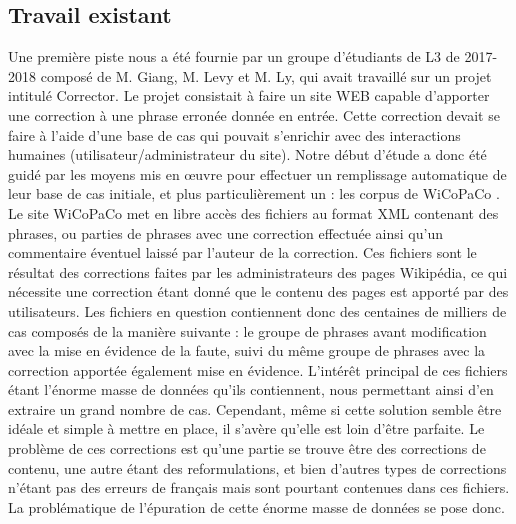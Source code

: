 \documentclass[11pt]{article}
\begin{document}
\subsection{Travail existant}

Une premi\`{e}re piste nous a \'{e}t\'{e} fournie par un groupe d'\'{e}tudiants de L3 de 2017-2018 compos\'{e} de M. Giang, M. Levy et M. Ly, qui avait travaill\'{e} sur un projet intitul\'{e} Corrector. Le projet consistait \`{a} faire un site WEB capable d'apporter une correction \`{a} une phrase erron\'{e}e donn\'{e}e en entr\'{e}e. Cette correction devait se faire \`{a} l'aide d'une base de cas qui pouvait s'enrichir avec des interactions humaines (utilisateur/administrateur du site). 
\newline
\newline
Notre d\'{e}but d'\'{e}tude a donc \'{e}t\'{e} guid\'{e} par les moyens mis en {\oe}uvre pour effectuer un remplissage automatique de leur base de cas initiale, et plus particuli\`{e}rement un : les corpus de WiCoPaCo \autocite[2]{https://wicopaco.limsi.fr}. Le site WiCoPaCo met en libre acc\`{e}s des fichiers au format XML contenant des phrases, ou parties de phrases avec une correction effectu\'{e}e ainsi qu'un commentaire \'{e}ventuel laiss\'{e} par l'auteur de la correction. Ces fichiers sont le r\'{e}sultat des corrections faites par les administrateurs des pages Wikip\'{e}dia, ce qui n\'{e}cessite une correction \'{e}tant donn\'{e} que le contenu des pages est apport\'{e} par des utilisateurs. Les fichiers en question contiennent donc des centaines de milliers de cas compos\'{e}s de la mani\`{e}re suivante : le groupe de phrases avant modification avec la mise en \'{e}vidence de la faute, suivi du m\^{e}me groupe de phrases avec la correction apport\'{e}e \'{e}galement mise en \'{e}vidence. 
\newline
\newline
L'int\'{e}r\^{e}t principal de ces fichiers \'{e}tant l'\'{e}norme masse de donn\'{e}es qu'ils contiennent, nous permettant ainsi d'en extraire un grand nombre de cas. Cependant, m\^{e}me si cette solution semble \^{e}tre id\'{e}ale et simple \`{a} mettre en place, il s'av\`{e}re qu'elle est loin d'\^{e}tre parfaite. Le probl\`{e}me de ces corrections est qu'une partie se trouve \^{e}tre des corrections de contenu, une autre \'{e}tant des reformulations, et bien d'autres types de corrections n'\'{e}tant pas des erreurs de fran\c{c}ais mais sont pourtant contenues dans ces fichiers. La probl\'{e}matique de l'\'{e}puration de cette \'{e}norme masse de donn\'{e}es se pose donc.
\end{document}

